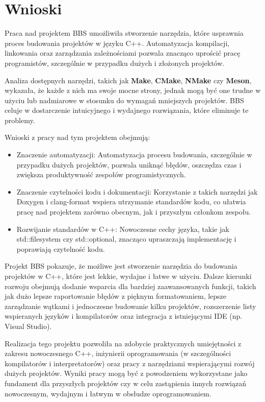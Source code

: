 \chapter{Wnioski}
Praca nad projektem BBS umożliwiła stworzenie narzędzia, które usprawnia proces budowania projektów w języku C++. Automatyzacja kompilacji, linkowania oraz zarządzania zależnościami pozwala znacząco uprościć pracę programistów, szczególnie w przypadku dużych i złożonych projektów.

Analiza dostępnych narzędzi, takich jak \textbf{Make}, \textbf{CMake}, \textbf{NMake} czy \textbf{Meson}, wykazała, że każde z nich ma swoje mocne strony, jednak mogą być one trudne w użyciu lub nadmiarowe w stosunku do wymagań mniejszych projektów. BBS celuje w dostarczenie intuicyjnego i wydajnego rozwiązania, które eliminuje te problemy.

Wnioski z pracy nad tym projektem obejmują:
\begin{itemize}
    \item Znaczenie automatyzacji: Automatyzacja procesu budowania, szczególnie w przypadku dużych projektów, pozwala uniknąć błędów, oszczędza czas i zwiększa produktywność zespołów programistycznych.
    \item Znaczenie czytelności kodu i dokumentacji: Korzystanie z takich narzędzi jak Doxygen i clang-format wspiera utrzymanie standardów kodu, co ułatwia pracę nad projektem zarówno obecnym, jak i przyszłym członkom zespołu.
    \item Rozwijanie standardów w C++: Nowoczesne cechy języka, takie jak std::filesystem czy std::optional, znacząco upraszczają implementację i poprawiają czytelność kodu.
\end{itemize}

Projekt BBS pokazuje, że możliwe jest stworzenie narzędzia do budowania projektów w C++, które jest lekkie, wydajne i łatwe w użyciu. Dalsze kierunki rozwoju obejmują dodanie wsparcia dla bardziej zaawansowanych funkcji, takich jak dużo lepsze raportowanie błędów z pięknym formatowaniem, lepsze zarządzanie wątkami i jednoczesne budowanie kilku projektów, rozszerzenie listy wspieranych języków i kompilatorów oraz integracja z istniejącymi IDE (np. Visual Studio).

Realizacja tego projektu pozwoliła na zdobycie praktycznych umiejętności z zakresu nowoczesnego C++, inżynierii oprogramowania (w szczególności kompilatorów i interpretatorów) oraz pracy z narzędziami wspierającymi rozwój dużych projektów. Wyniki pracy mogą być z powodzeniem wykorzystane jako fundament dla przyszłych projektów czy w celu zastąpienia innych rozwiązań nowoczesnym, wydajnym i łatwym w obsłudze oprogramowaniem.